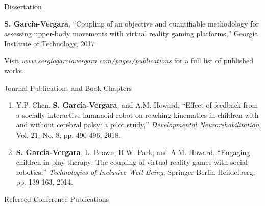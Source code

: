 \documentclass{resume} %
\newcommand{\sectionspace}{\vspace{3mm}}
\newcommand{\Sergio}{\textbf{S. Garc\'{i}a-Vergara}}
\newcommand{\SuperPop}{Super Pop VR\textsuperscript{TM}\space}
\begin{document}

\sectionspace
\begin{rSection}{Dissertation}

  \Sergio, ``Coupling of an objective and quantifiable methodology for
  assessing upper-body movements with virtual reality gaming platforms,''
  Georgia Institute of Technology, 2017

  Visit \textit{www.sergiogarciavergara.com/pages/publications} for a full list
  of published works.


\iffalse

\begin{rSubsection}{Journal Publications and Book Chapters}{}{}{}
\item
\begin{enumerate}

\item Y.P. Chen, \Sergio, and A.M. Howard, ``Effect of feedback from a socially
  interactive humanoid robot on reaching kinematics in children with and without
  cerebral palsy: a pilot study,'' \textit{Developmental Neurorehabilitation},
  Vol. 21, No. 8, pp. 490-496, 2018.


\item \Sergio, L. Brown, H.W. Park, and A.M. Howard, ``Engaging children in play
  therapy: The coupling of virtual reality games with social robotics,''
  \textit{Technologies of Inclusive Well-Being}, Springer Berlin Heildelberg,
  pp. 139-163, 2014.
\end{enumerate}
\end{rSubsection}


\sectionspace

\begin{rSubsection}{Refereed Conference Publications}{}{}{}
\item
\begin{enumerate}


\end{enumerate}
\end{rSubsection}
\end{rSection}
\end{document}
